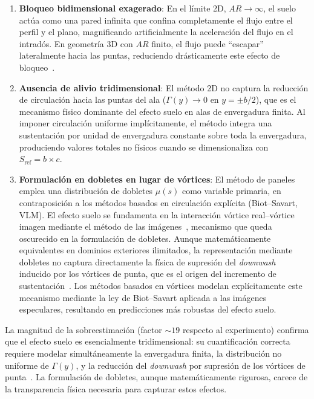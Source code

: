 \documentclass[twocolumn]{article}
\begin{document}
\begin{enumerate}
  \item \textbf{Bloqueo bidimensional exagerado}: En el límite 2D,
    $\mathit{AR} \to \infty$, el suelo actúa como una pared infinita
    que confina completamente el flujo entre el perfil y el plano,
    magnificando artificialmente la aceleración del flujo en el
    intradós. En geometría 3D con $\mathit{AR}$ finito, el flujo puede
    ``escapar'' lateralmente hacia las puntas, reduciendo drásticamente
    este efecto de bloqueo~\cite{ahmed2007}.
    
  \item \textbf{Ausencia de alivio tridimensional}: El método 2D no
    captura la reducción de circulación hacia las puntas del ala
    ($\Gamma(y) \to 0$ en $y = \pm b/2$), que es el mecanismo físico
    dominante del efecto suelo en alas de envergadura finita. Al
    imponer circulación uniforme implícitamente, el método integra
    una sustentación por unidad de envergadura constante sobre toda
    la envergadura, produciendo valores totales no físicos cuando se
    dimensionaliza con $S_\text{ref} = b \times c$.
    
  \item \textbf{Formulación en dobletes en lugar de vórtices}: El método
    de paneles emplea una distribución de dobletes $\mu(s)$ como variable
    primaria, en contraposición a los métodos basados en circulación
    explícita (Biot--Savart, VLM). El efecto suelo se fundamenta en la
    interacción vórtice real--vórtice imagen mediante el método de las
    imágenes~\cite{katz2001}, mecanismo que queda oscurecido en la
    formulación de dobletes. Aunque matemáticamente equivalentes en
    dominios exteriores ilimitados, la representación mediante dobletes
    no captura directamente la física de supresión del \textit{downwash}
    inducido por los vórtices de punta, que es el origen del incremento
    de sustentación~\cite{prandtl1921}. Los métodos basados en vórtices
    modelan explícitamente este mecanismo mediante la ley de Biot--Savart
    aplicada a las imágenes especulares, resultando en predicciones más
    robustas del efecto suelo.
\end{enumerate}

La magnitud de la sobreestimación (factor ${\sim}19$ respecto al
experimento) confirma que el efecto suelo es esencialmente
tridimensional: su cuantificación correcta requiere modelar
simultáneamente la envergadura finita, la distribución no uniforme
de $\Gamma(y)$, y la reducción del \textit{downwash} por supresión
de los vórtices de punta~\cite{zerihan2000}. La formulación de
dobletes, aunque matemáticamente rigurosa, carece de la transparencia
física necesaria para capturar estos efectos.
\end{document}
